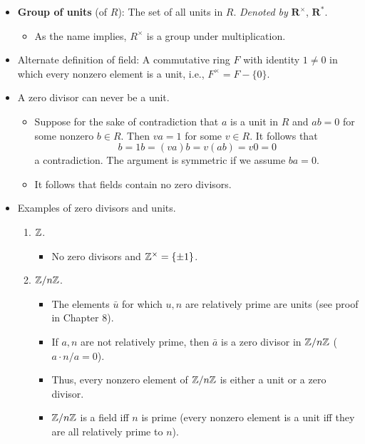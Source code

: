 \documentclass[../notes.tex]{subfiles}
\begin{document}
\begin{itemize}
\begin{itemize}
    \end{itemize}
    \item \textbf{Group of units} (of $R$): The set of all units in $R$. \emph{Denoted by} $\bm{R^\times}$, $\bm{R^*}$.
    \begin{itemize}
        \item As the name implies, $R^\times$ is a group under multiplication.
    \end{itemize}
    \item Alternate definition of field: A commutative ring $F$ with identity $1\neq 0$ in which every nonzero element is a unit, i.e., $F^\times=F-\{0\}$.
    \item A zero divisor can never be a unit.
    \begin{itemize}
        \item Suppose for the sake of contradiction that $a$ is a unit in $R$ and $ab=0$ for some nonzero $b\in R$. Then $va=1$ for some $v\in R$. It follows that
        \begin{equation*}
            b = 1b = (va)b = v(ab) = v0 = 0
        \end{equation*}
        a contradiction. The argument is symmetric if we assume $ba=0$.
        \item It follows that fields contain no zero divisors.
    \end{itemize}
    \item Examples of zero divisors and units.
    \begin{enumerate}
        \item $\mathbb{Z}$.
        \begin{itemize}
            \item No zero divisors and $\mathbb{Z}^\times=\{\pm 1\}$.
        \end{itemize}
        \item $\mathbb{Z}/n\mathbb{Z}$.
        \begin{itemize}
            \item The elements $\bar{u}$ for which $u,n$ are relatively prime are units (see proof in Chapter 8).
            \item If $a,n$ are not relatively prime, then $\bar{a}$ is a zero divisor in $\mathbb{Z}/n\mathbb{Z}$ ($a\cdot n/a=0$).
            \item Thus, every nonzero element of $\mathbb{Z}/n\mathbb{Z}$ is either a unit or a zero divisor.
            \item $\mathbb{Z}/n\mathbb{Z}$ is a field iff $n$ is prime (every nonzero element is a unit iff they are all relatively prime to $n$).
        \end{itemize}

\end{enumerate}
\end{itemize}
\end{document}
